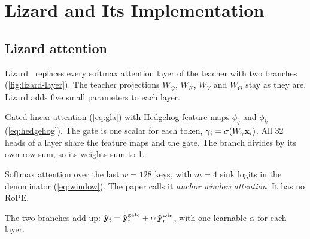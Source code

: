 \chapter{Lizard and Its Implementation}
\label{ch:lizard}

\section{Lizard attention}
\label{sec:lizard-attn}

Lizard~\cite{lizard} replaces every softmax attention layer of the teacher with two branches (\cref{fig:lizard-layer}). The teacher projections $W_Q$, $W_K$, $W_V$ and $W_O$ stay as they are. Lizard adds five small parameters to each layer.

\begin{description}[leftmargin=0.6cm,style=nextline]
\item[Gated branch] Gated linear attention (\cref{eq:gla}) with Hedgehog feature maps $\phi_q$ and $\phi_k$ (\cref{eq:hedgehog}). The gate is one scalar for each token, $\gamma_i = \sigma(W_\gamma \mathbf{x}_i)$. All 32 heads of a layer share the feature maps and the gate. The branch divides by its own row sum, so its weights sum to 1.
\item[Window branch] Softmax attention over the last $w = 128$ keys, with $m = 4$ sink logits in the denominator (\cref{eq:window}). The paper calls it \emph{anchor window attention}. It has no RoPE.
\item[Output] The two branches add up: $\hat{\mathbf{y}}_i = \hat{\mathbf{y}}^{\text{gate}}_i + \alpha\, \hat{\mathbf{y}}^{\text{win}}_i$, with one learnable $\alpha$ for each layer.
\end{description}


